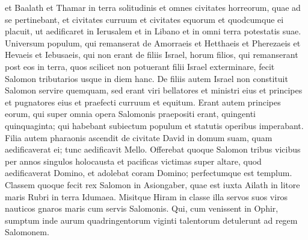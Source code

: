 \begin{biblechapter}
\begin{biblechapter}
\begin{biblechapter}
\begin{biblechapter}
\begin{biblechapter}
\begin{biblechapter}
\begin{biblechapter}
\begin{biblechapter}
\begin{biblechapter}
\verse et Baalath et Thamar in terra solitudinis 
\verse et omnes civitates horreorum, quae ad se pertinebant, et civitates curruum et civitates equorum et quodcumque ei placuit, ut aedificaret in Ierusalem et in Libano et in omni terra potestatis suae. 
\verse Universum populum, qui remanserat de Amorraeis et Hetthaeis et Pherezaeis et Hevaeis et Iebusaeis, qui non erant de filiis Israel, 
\verse horum filios, qui remanserant post eos in terra, quos scilicet non potuerant filii Israel exterminare, fecit Salomon tributarios usque in diem hanc. 
\verse De filiis autem Israel non constituit Salomon servire quemquam, sed erant viri bellatores et ministri eius et principes et pugnatores eius et praefecti curruum et equitum. 
\verse Erant autem principes eorum, qui super omnia opera Salomonis praepositi erant, quingenti quinquaginta; qui habebant subiectum populum et statutis operibus imperabant.
 \verse Filia autem pharaonis ascendit de civitate David in domum suam, quam aedificaverat ei; tunc aedificavit Mello.
 \verse Offerebat quoque Salomon tribus vicibus per annos singulos holocausta et pacificas victimas super altare, quod aedificaverat Domino, et adolebat coram Domino; perfectumque est templum.
 \verse Classem quoque fecit rex Salomon in Asiongaber, quae est iuxta Ailath in litore maris Rubri in terra Idumaea. 
\verse Misitque Hiram in classe illa servos suos viros nauticos gnaros maris cum servis Salomonis. 
\verse Qui, cum venissent in Ophir, sumptum inde aurum quadringentorum viginti talentorum detulerunt ad regem Salomonem.
 

\end{biblechapter}
\end{biblechapter}
\end{biblechapter}
\end{biblechapter}
\end{biblechapter}
\end{biblechapter}
\end{biblechapter}
\end{biblechapter}
\end{biblechapter}
